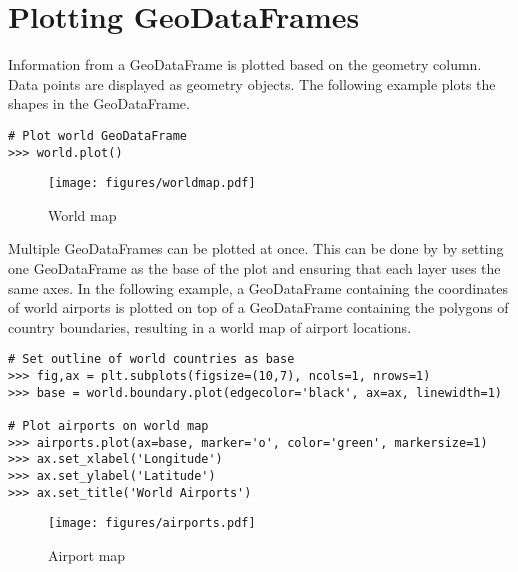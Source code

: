 \section*{Plotting GeoDataFrames} %

Information from a GeoDataFrame is plotted based on the geometry column.
Data points are displayed as geometry objects.
The following example plots the shapes in the  GeoDataFrame.

\begin{lstlisting}
# Plot world GeoDataFrame
>>> world.plot()
\end{lstlisting}

\begin{figure}[H]
\begin{center}
\texttt{[image: figures/worldmap.pdf]}
\end{center}
\label{world-map}
\caption{World map}
\end{figure} 

Multiple GeoDataFrames can be plotted at once.
This can be done by by setting one GeoDataFrame as the base of the plot and ensuring that each layer uses the same axes.
In the following example, a GeoDataFrame containing the coordinates of world airports is plotted on top of a GeoDataFrame containing the polygons of country boundaries, resulting in a world map of airport locations.

\begin{lstlisting}
# Set outline of world countries as base
>>> fig,ax = plt.subplots(figsize=(10,7), ncols=1, nrows=1)
>>> base = world.boundary.plot(edgecolor='black', ax=ax, linewidth=1)

# Plot airports on world map
>>> airports.plot(ax=base, marker='o', color='green', markersize=1)
>>> ax.set_xlabel('Longitude')
>>> ax.set_ylabel('Latitude')
>>> ax.set_title('World Airports')
\end{lstlisting}

\begin{figure}[H]
\begin{center}
\texttt{[image: figures/airports.pdf]}
\end{center}
\label{airport-map}
\caption{Airport map}
\end{figure}

